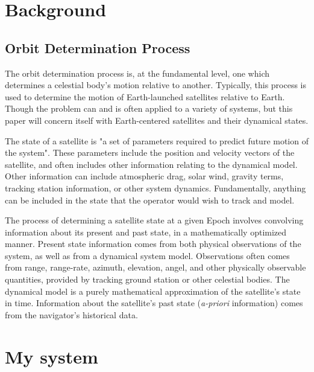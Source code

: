 \documentclass[11pt,a4paper,oneside]{article}
\begin{document}
\newpage
\section{Background}

\subsection{Orbit Determination Process}
The orbit determination process is, at the fundamental level, one which determines a celestial body's motion relative to another. Typically, this process is used to determine the motion of Earth-launched satellites relative to Earth. Though the problem can and is often applied to a variety of systems, but this paper will concern itself with Earth-centered satellites and their dynamical states. 

The state of a satellite is "a set of parameters required to predict future motion of the system"\cite{tapley2004statistical}. These parameters include the position and velocity vectors of the satellite, and often includes other information relating to the dynamical model. Other information can include atmospheric drag, solar wind, gravity terms, tracking station information, or other system dynamics. Fundamentally, anything can be included in the state that the operator would wish to track and model. 

The process of determining a satellite state at a given Epoch involves convolving information about its present and past state, in a mathematically optimized manner. Present state information comes from both physical observations of the system, as well as from a dynamical system model. Observations often comes from range, range-rate, azimuth, elevation, angel, and other physically observable quantities, provided by tracking ground station or other celestial bodies. The dynamical model is a purely mathematical approximation of the satellite's state in time. Information about the satellite's past state (\emph{a-priori} information) comes from the navigator's historical data. 




\section{My system}








\newpage



%
\end{document}
